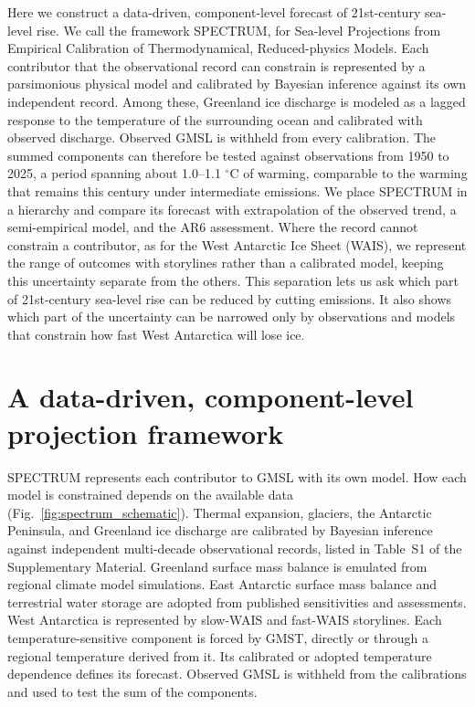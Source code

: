 \documentclass[draft,linenumbers]{agujournal2025}
\begin{document}
Here we construct a data-driven, component-level forecast of 21st-century sea-level rise. We call the framework SPECTRUM, for Sea-level Projections from Empirical Calibration of Thermodynamical, Reduced-physics Models. Each contributor that the observational record can constrain is represented by a parsimonious physical model and calibrated by Bayesian inference against its own independent record. Among these, Greenland ice discharge is modeled as a lagged response to the temperature of the surrounding ocean and calibrated with observed discharge. Observed GMSL is withheld from every calibration. The summed components can therefore be tested against observations from 1950 to 2025, a period spanning about 1.0--1.1 $^\circ$C of warming, comparable to the warming that remains this century under intermediate emissions. We place SPECTRUM in a hierarchy and compare its forecast with extrapolation of the observed trend, a semi-empirical model, and the AR6 assessment. Where the record cannot constrain a contributor, as for the West Antarctic Ice Sheet (WAIS), we represent the range of outcomes with storylines rather than a calibrated model, keeping this uncertainty separate from the others. This separation lets us ask which part of 21st-century sea-level rise can be reduced by cutting emissions. It also shows which part of the uncertainty can be narrowed only by observations and models that constrain how fast West Antarctica will lose ice.



\section{A data-driven, component-level projection framework}

SPECTRUM represents each contributor to GMSL with its own model. How each model is constrained depends on the available data (Fig.~\ref{fig:spectrum_schematic}). Thermal expansion, glaciers, the Antarctic Peninsula, and Greenland ice discharge are calibrated by Bayesian inference against independent multi-decade observational records, listed in Table~S1 of the Supplementary Material. Greenland surface mass balance is emulated from regional climate model simulations. East Antarctic surface mass balance and terrestrial water storage are adopted from published sensitivities and assessments. West Antarctica is represented by slow-WAIS and fast-WAIS storylines. Each temperature-sensitive component is forced by GMST, directly or through a regional temperature derived from it. Its calibrated or adopted temperature dependence defines its forecast. Observed GMSL is withheld from the calibrations and used to test the sum of the components.
\end{document}
